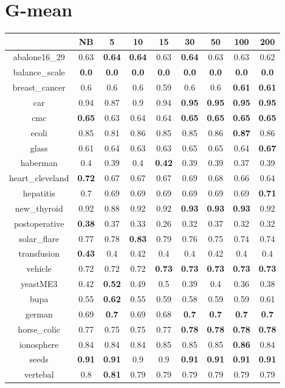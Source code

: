 \documentclass{article}%
\begin{document}
%
\section*{G{-}mean}%
\begin{tabular}{c|cccccccc}%
\hline%
&NB&5&10&15&30&50&100&200\\%
\hline%
abalone16\_29&0.63&\textbf{0.64}&\textbf{0.64}&0.63&\textbf{0.64}&0.63&0.63&0.62\\%
\hline%
balance\_scale&\textbf{0.0}&\textbf{0.0}&\textbf{0.0}&\textbf{0.0}&\textbf{0.0}&\textbf{0.0}&\textbf{0.0}&\textbf{0.0}\\%
\hline%
breast\_cancer&0.6&0.6&0.6&0.59&0.6&0.6&\textbf{0.61}&\textbf{0.61}\\%
\hline%
car&0.94&0.87&0.9&0.94&\textbf{0.95}&\textbf{0.95}&\textbf{0.95}&\textbf{0.95}\\%
\hline%
cmc&\textbf{0.65}&0.63&0.64&0.64&\textbf{0.65}&\textbf{0.65}&\textbf{0.65}&\textbf{0.65}\\%
\hline%
ecoli&0.85&0.81&0.86&0.85&0.85&0.86&\textbf{0.87}&0.86\\%
\hline%
glass&0.61&0.64&0.63&0.63&0.65&0.65&0.64&\textbf{0.67}\\%
\hline%
haberman&0.4&0.39&0.4&\textbf{0.42}&0.39&0.39&0.37&0.39\\%
\hline%
heart\_cleveland&\textbf{0.72}&0.67&0.67&0.67&0.69&0.68&0.66&0.64\\%
\hline%
hepatitis&0.7&0.69&0.69&0.69&0.69&0.69&0.69&\textbf{0.71}\\%
\hline%
new\_thyroid&0.92&0.88&0.92&0.92&\textbf{0.93}&\textbf{0.93}&\textbf{0.93}&0.92\\%
\hline%
postoperative&\textbf{0.38}&0.37&0.33&0.26&0.32&0.37&0.32&0.32\\%
\hline%
solar\_flare&0.77&0.78&\textbf{0.83}&0.79&0.76&0.75&0.74&0.74\\%
\hline%
transfusion&\textbf{0.43}&0.4&0.42&0.4&0.4&0.42&0.4&0.4\\%
\hline%
vehicle&0.72&0.72&0.72&\textbf{0.73}&\textbf{0.73}&\textbf{0.73}&\textbf{0.73}&\textbf{0.73}\\%
\hline%
yeastME3&0.42&\textbf{0.52}&0.49&0.5&0.39&0.4&0.36&0.38\\%
\hline%
bupa&0.55&\textbf{0.62}&0.55&0.59&0.58&0.59&0.59&0.61\\%
\hline%
german&0.69&\textbf{0.7}&0.69&0.68&\textbf{0.7}&\textbf{0.7}&\textbf{0.7}&\textbf{0.7}\\%
\hline%
horse\_colic&0.77&0.75&0.75&0.77&\textbf{0.78}&\textbf{0.78}&\textbf{0.78}&\textbf{0.78}\\%
\hline%
ionosphere&0.84&0.84&0.84&0.85&0.85&0.85&\textbf{0.86}&0.84\\%
\hline%
seeds&\textbf{0.91}&\textbf{0.91}&0.9&0.9&\textbf{0.91}&\textbf{0.91}&\textbf{0.91}&\textbf{0.91}\\%
\hline%
vertebal&0.8&\textbf{0.81}&0.79&0.79&0.79&0.79&0.79&0.79\\%
\hline%
\end{tabular}

%
\end{document}
